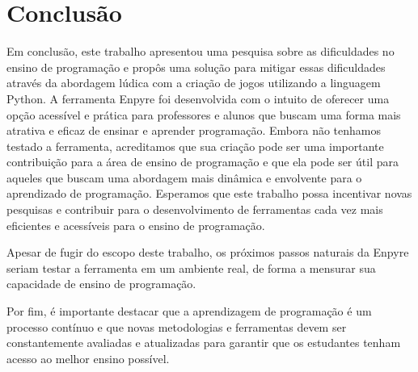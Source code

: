 \chapter[Conclusão]{Conclusão}

Em conclusão, este trabalho apresentou uma pesquisa sobre as dificuldades no ensino de programação e propôs uma solução para mitigar essas dificuldades através da abordagem lúdica com a criação de jogos utilizando a linguagem Python. A ferramenta Enpyre foi desenvolvida com o intuito de oferecer uma opção acessível e prática para professores e alunos que buscam uma forma mais atrativa e eficaz de ensinar e aprender programação. Embora não tenhamos testado a ferramenta, acreditamos que sua criação pode ser uma importante contribuição para a área de ensino de programação e que ela pode ser útil para aqueles que buscam uma abordagem mais dinâmica e envolvente para o aprendizado de programação. Esperamos que este trabalho possa incentivar novas pesquisas e contribuir para o desenvolvimento de ferramentas cada vez mais eficientes e acessíveis para o ensino de programação.


Apesar de fugir do escopo deste trabalho, os próximos passos naturais da Enpyre seriam testar a ferramenta em um ambiente real, de forma a mensurar sua capacidade de ensino de programação.

Por fim, é importante destacar que a aprendizagem de programação é um processo contínuo e que novas metodologias e ferramentas devem ser constantemente avaliadas e atualizadas para garantir que os estudantes tenham acesso ao melhor ensino possível.
